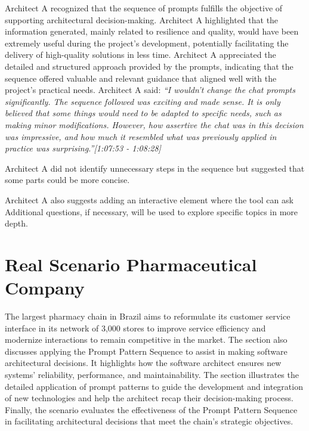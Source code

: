 
Architect A recognized that the sequence of prompts fulfills the objective of supporting architectural decision-making. Architect A highlighted that the information generated, mainly related to resilience and quality, would have been extremely useful during the project's development, potentially facilitating the delivery of high-quality solutions in less time. Architect A appreciated the detailed and structured approach provided by the prompts, indicating that the sequence offered valuable and relevant guidance that aligned well with the project's practical needs. Architect A said: \textit{``I wouldn't change the chat prompts significantly. The sequence followed was exciting and made sense. It is only believed that some things would need to be adapted to specific needs, such as making minor modifications. However, how assertive the chat was in this decision was impressive, and how much it resembled what was previously applied in practice was surprising.''[1:07:53 - 1:08:28]}

Architect A did not identify unnecessary steps in the sequence but suggested that
some parts could be more concise.

Architect A also suggests adding an interactive element where the tool can ask
Additional questions, if necessary, will be used to explore specific topics in more depth.

\section{Real Scenario Pharmaceutical Company}

The largest pharmacy chain in Brazil aims to reformulate its customer service interface in its network of 3,000 stores to improve service efficiency and modernize interactions to remain competitive in the market. The section also discusses applying the Prompt Pattern Sequence to assist in making software architectural decisions. It highlights how the software architect ensures new systems' reliability, performance, and maintainability. The section illustrates the detailed application of prompt patterns to guide the development and integration of new technologies and help the architect recap their decision-making process. Finally, the scenario evaluates the effectiveness of the Prompt Pattern Sequence in facilitating architectural decisions that meet the chain's strategic objectives.



